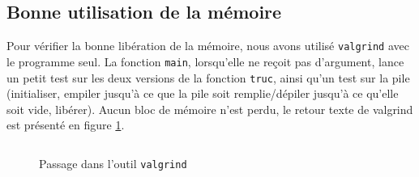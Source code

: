 \subsection{Bonne utilisation de la mémoire}
	Pour vérifier la bonne libération de la mémoire, nous avons utilisé \texttt{valgrind} avec le programme seul. La fonction \texttt{main}, lorsqu'elle ne reçoit pas d'argument, lance un petit test sur les deux versions de la fonction \texttt{truc}, ainsi qu'un test sur la pile (initialiser, empiler jusqu'à ce que la pile soit remplie/dépiler jusqu'à ce qu'elle soit vide, libérer). Aucun bloc de mémoire n'est perdu, le retour texte de valgrind est présenté en figure \ref{fig:valgrind}.
	\begin{figure}[H]
	  \inputminted[frame=single,label=Resultat Valgrind]{text}{../tests/valgrind_test}
	  \caption{Passage dans l'outil \texttt{valgrind}}
	  \label{fig:valgrind}
	\end{figure}
